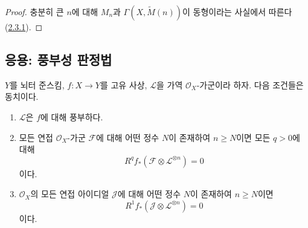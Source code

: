 \begin{proof}
충분히 큰 $n$에 대해 $M_n$과 $\Gamma(X,\widetilde M(n))$이
동형이라는 사실에서 따른다 (\hyperref[III.2.3.1-fr]{2.3.1}).
\end{proof}

\subsection{응용: 풍부성 판정법}
\label{subsection:III.2.6-fr}

\begin{proposition}[2.6.1]
\label{III.2.6.1-fr}
$Y$를 뇌터 준스킴, $f:X\to Y$를 고유 사상,
$\mathcal L$을 가역 $\mathcal O_X$-가군이라 하자. 다음 조건들은
동치이다.
\begin{enumerate}
\item[a)] $\mathcal L$은 $f$에 대해 풍부하다.
\item[b)] 모든 연접 $\mathcal O_X$-가군 $\mathcal F$에 대해 어떤
정수 $N$이 존재하여 $n\geq N$이면 모든 $q>0$에 대해
\[
R^qf_*(\mathcal F\otimes\mathcal L^{\otimes n})=0
\]
이다.
\item[c)] $\mathcal O_X$의 모든 연접 아이디얼 $\mathcal J$에 대해
어떤 정수 $N$이 존재하여 $n\geq N$이면
\[
R^1f_*(\mathcal J\otimes\mathcal L^{\otimes n})=0
\]
이다.
\end{enumerate}
\end{proposition}

